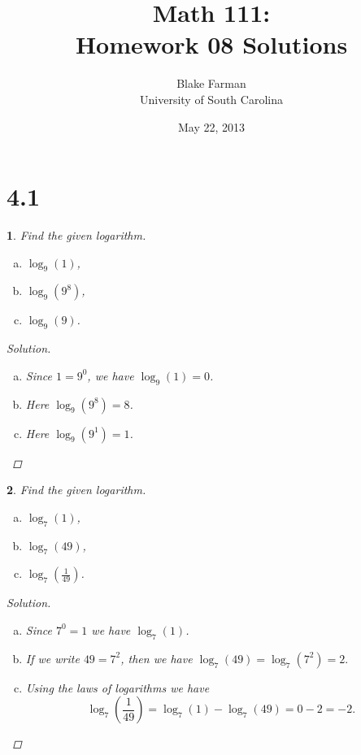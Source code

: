 \documentclass[12pt]{amsart}
\author{Blake Farman\\University of South Carolina}
\title{Math 111:\\Homework 08 Solutions}
\date{May 22, 2013}
\newtheorem{thm}{}
\begin{document}
\maketitle

\section*{4.1}

\setcounter{thm}{15} 
\begin{thm}
  Find the given logarithm.
  \begin{enumerate}[(a)]
  \item
    $\log_9(1)$,
  \item
    $\log_9(9^8)$,
  \item
    $\log_9(9)$.
  \end{enumerate}

  \begin{proof}[Solution]
    \begin{enumerate}[(a)]
    \item
      Since $1 = 9^0$, we have $\log_9(1) = 0$.
    \item
      Here $\log_9(9^8) = 8$.
    \item
      Here $\log_9(9^1) = 1$.
    \end{enumerate}
  \end{proof}
\end{thm}

\setcounter{thm}{17} 
\begin{thm}
  Find the given logarithm.
  \begin{enumerate}[(a)]
  \item
    $\log_7(1)$,
  \item
    $\log_7(49)$,
  \item
    $\log_7(\frac{1}{49})$.
  \end{enumerate}
  
  \begin{proof}[Solution]
    \begin{enumerate}[(a)]
    \item
      Since $7^0 = 1$ we have $\log_7(1)$.
    \item
      If we write $49 = 7^2$, then we have $\log_7(49) = \log_7(7^2) = 2.$
    \item
      Using the laws of logarithms we have 
      $$\log_7\left(\frac{1}{49}\right) = \log_7(1) - \log_7(49) = 0 - 2 = -2.$$
    \end{enumerate}
  \end{proof}
\end{thm}
\end{document}
